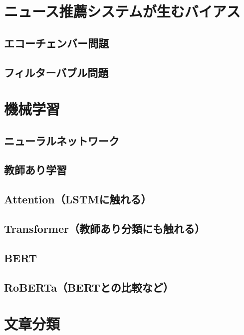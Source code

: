 \documentclass[12pt,a4j]{jreport}
\begin{document}
\section{ニュース推薦システムが生むバイアス}


\subsection{エコーチェンバー問題}


\subsection{フィルターバブル問題}


\section{機械学習}


\subsection{ニューラルネットワーク}


\subsection{教師あり学習}


\subsection{Attention（LSTMに触れる）}


\subsection{Transformer（教師あり分類にも触れる）}


\subsection{BERT}


\subsection{RoBERTa（BERTとの比較など）}


\section{文章分類}
\end{document}
